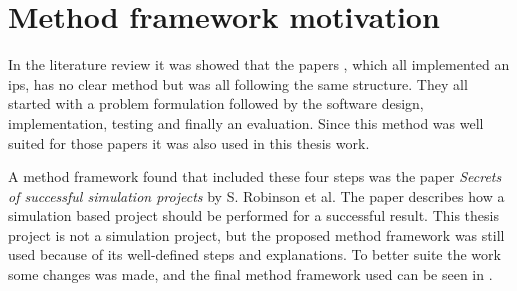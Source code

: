 \section{Method framework motivation}\label{sec:methodFramework}

In the literature review it was showed that the papers \cite{BluetoothLowEnergy2018, DevelopmentSmartphoneBasedUniversity2021, PracticalFingerprintingLocalization2017}, which all implemented an \acrfull{ips}, has no clear method but was all following the same structure.
They all started with a problem formulation followed by the software design, implementation, testing and finally an evaluation.
Since this method was well suited for those papers it was also used in this thesis work.

\bigskip

A method framework found that included these four steps was the paper \textit{Secrets of successful simulation projects} \cite{SecretsSuccessfulSimulation1995} by S. Robinson et al.
The paper describes how a simulation based project should be performed for a successful result.
This thesis project is not a simulation project, but the proposed method framework  was still used because of its well-defined steps and explanations.
To better suite the work some changes was made, and the final method framework used can be seen in .



